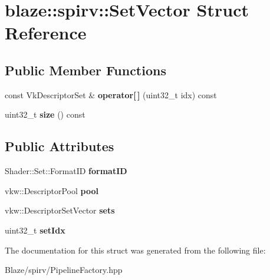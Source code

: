 \hypertarget{structblaze_1_1spirv_1_1SetVector}{}\section{blaze\+:\+:spirv\+:\+:Set\+Vector Struct Reference}
\label{structblaze_1_1spirv_1_1SetVector}
\subsection*{Public Member Functions}
\begin{DoxyCompactItemize}
\item 
\mbox{\label{structblaze_1_1spirv_1_1SetVector_a4b9598732811653172d5c6904da02406}} 
const Vk\+Descriptor\+Set \& {\bfseries operator\mbox{[}$\,$\mbox{]}} (uint32\+\_\+t idx) const
\item 
\mbox{\label{structblaze_1_1spirv_1_1SetVector_ab0d7db43f84e0a39019b55eef4890f99}} 
uint32\+\_\+t {\bfseries size} () const
\end{DoxyCompactItemize}
\subsection*{Public Attributes}
\begin{DoxyCompactItemize}
\item 
\mbox{\label{structblaze_1_1spirv_1_1SetVector_a317f8d377122785c99cc0e9cef2e2195}} 
Shader\+::\+Set\+::\+Format\+ID {\bfseries format\+ID}
\item 
\mbox{\label{structblaze_1_1spirv_1_1SetVector_a5bd781f225cca55af5990d2045225a42}} 
vkw\+::\+Descriptor\+Pool {\bfseries pool}
\item 
\mbox{\label{structblaze_1_1spirv_1_1SetVector_a1826547495d44b376c29ec8c7b0d4ff0}} 
vkw\+::\+Descriptor\+Set\+Vector {\bfseries sets}
\item 
\mbox{\label{structblaze_1_1spirv_1_1SetVector_a0632f6d397163952e42136528b6639ab}} 
uint32\+\_\+t {\bfseries set\+Idx}
\end{DoxyCompactItemize}


The documentation for this struct was generated from the following file\+:\begin{DoxyCompactItemize}
\item 
Blaze/spirv/Pipeline\+Factory.\+hpp\end{DoxyCompactItemize}
